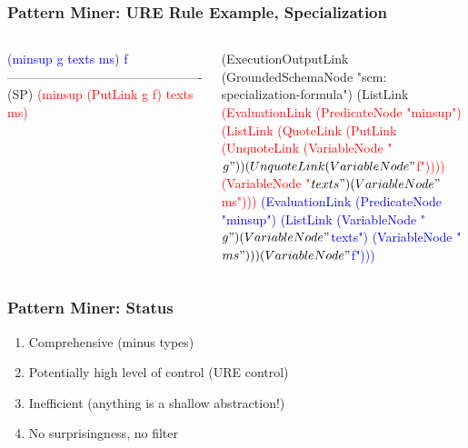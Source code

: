 \documentclass{beamer}
\begin{document}
\begin{frame}[fragile]
  \frametitle{Pattern Miner: URE Rule Example, Specialization}

  \begin{columns}

    \column{1.2in}

{\tiny \begin{semiverbatim}
\textcolor{blue}{(minsup g texts ms)           f}
----------------------------------------------(SP)
\textcolor{red}{(minsup (PutLink g f) texts ms)}
\end{semiverbatim}}

    \column{2in}

  {\tiny
\begin{semiverbatim}
(ExecutionOutputLink
  (GroundedSchemaNode "scm: specialization-formula")
  (ListLink
    \textcolor{red}{(EvaluationLink
      (PredicateNode "minsup")
      (ListLink
        (QuoteLink
          (PutLink
            (UnquoteLink
              (VariableNode "$g"))
            (UnquoteLink
              (VariableNode "$f"))))
        (VariableNode "$texts")
        (VariableNode "$ms")))}
    \textcolor{blue}{(EvaluationLink
      (PredicateNode "minsup")
      (ListLink
        (VariableNode "$g")
        (VariableNode "$texts")
        (VariableNode "$ms")))
    (VariableNode "$f")))}
\end{semiverbatim}}

  \end{columns}

\end{frame}

\begin{frame}
  \frametitle{Pattern Miner: Status}

    \begin{enumerate}
    \item<+-> \alert{Comprehensive} (minus types)
    \item<+-> Potentially \alert{high level of control} (URE control)
    \item<+-> \alert{Inefficient} (anything is a shallow abstraction!)
    \item<+-> No surprisingness, no filter
    \end{enumerate}

\end{frame}
\end{document}
